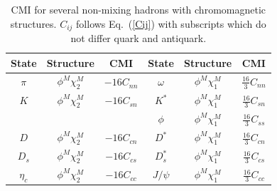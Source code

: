 \documentclass[prd,twocolumn,floatfix,nofootinbib]{revtex4}
\begin{document}
\renewcommand{\tabcolsep}{0.49cm}
\renewcommand{\arraystretch}{1.5}
\begin{table}[!htbp]
    \caption{CMI for several non-mixing hadrons with chromomagnetic structures. $C_{ij}$ follows Eq.~(\ref{Cij}) with subscripts which do not differ quark and antiquark.}
    \label{tab:CMI}
    \begin{tabular}{cccccc}
        \hline\hline
        {\rm State}     &{\rm Structure}            &{\rm CMI}      &{\rm State}        &{\rm Structure}            &{\rm CMI} \\ \hline
        $\pi$           &$\phi^{M}\chi_{2}^{M}$     &$-16C_{nn}$    &$\omega$           &$\phi^{M}\chi_{1}^{M}$     &$\frac{16}{3}C_{nn}$ \\ 
        $K$             &$\phi^{M}\chi_{2}^{M}$     &$-16C_{sn}$    &$K^{\ast}$         &$\phi^{M}\chi_{1}^{M}$     &$\frac{16}{3}C_{sn}$ \\ 
                        &                           &               &$\phi$             &$\phi^{M}\chi_{1}^{M}$     &$\frac{16}{3}C_{ss}$ \\ 
        $D$             &$\phi^{M}\chi_{2}^{M}$     &$-16C_{cn}$    &$D^{\ast}$         &$\phi^{M}\chi_{1}^{M}$     &$\frac{16}{3}C_{cn}$ \\ 
        $D_{s}$         &$\phi^{M}\chi_{2}^{M}$     &$-16C_{cs}$    &$D_{s}^{\ast}$     &$\phi^{M}\chi_{1}^{M}$     &$\frac{16}{3}C_{cs}$ \\ 
        $\eta_{c}$      &$\phi^{M}\chi_{2}^{M}$     &$-16C_{cc}$    &$J/\psi$           &$\phi^{M}\chi_{1}^{M}$     &$\frac{16}{3}C_{cc}$ \\ 
        

\end{tabular}
\end{table}
\end{document}
